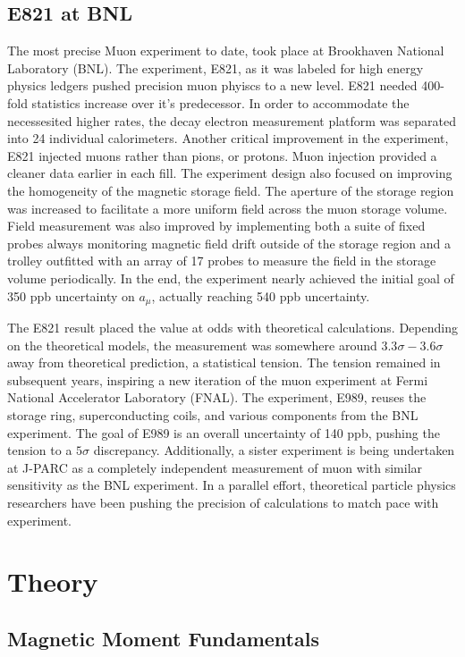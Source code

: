 \subsection{E821 at BNL}
The most precise Muon \gmtwo experiment to date, took place at Brookhaven National Laboratory (BNL). The experiment, E821, as it was labeled for high energy physics ledgers pushed precision muon phyiscs to a new level.  E821 needed 400-fold statistics increase over it's predecessor.  In order to accommodate the necessesited higher rates, the decay electron measurement platform was separated into 24 individual calorimeters.  Another critical improvement in the experiment, E821 injected muons rather than pions, or protons.  Muon injection provided a cleaner data earlier in each fill.  The experiment design also focused on improving the homogeneity of the magnetic storage field.  The aperture of the storage region was increased to facilitate a more uniform field across the muon storage volume.  Field measurement was also improved by implementing both a suite of fixed probes always monitoring magnetic field drift outside of the storage region and a trolley outfitted with an array of 17 probes to measure the field in the storage volume periodically.  In the end, the experiment nearly achieved the initial goal of 350 ppb uncertainty on $a_\mu$, actually reaching 540 ppb uncertainty.

The E821 \gmtwo result placed the value at odds with theoretical calculations.  Depending on the theoretical models, the measurement was somewhere around $3.3\sigma - 3.6\sigma$ away from theoretical prediction, a statistical tension.  The tension remained in subsequent years, inspiring a new iteration of the muon \gmtwo experiment at Fermi National Accelerator Laboratory (FNAL). The experiment, E989, reuses the storage ring, superconducting coils, and various components from the BNL experiment.  The goal of E989 is an overall uncertainty of 140 ppb, pushing the tension to a $5\sigma$ discrepancy. Additionally, a sister experiment is being undertaken at J-PARC as a completely independent measurement of muon \gmtwo with similar sensitivity as the BNL experiment.  In a parallel effort, theoretical particle physics researchers have been pushing the precision of calculations to match pace with experiment.

\section{Theory}

\subsection{Magnetic Moment Fundamentals}

